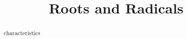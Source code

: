 \documentclass{ximera}
\title{Roots and Radicals}
\begin{document}
\begin{abstract}
characteristics
\end{abstract}
\maketitle
\end{document}
